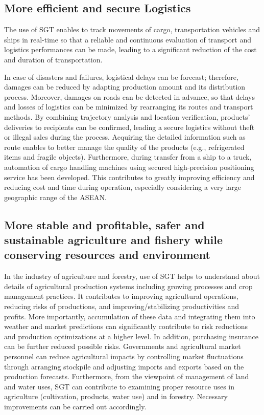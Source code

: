 \subsection{More efficient and secure Logistics}

\tab The use of SGT enables to track movements of cargo, transportation vehicles and ships in real-time so that a reliable and continuous evaluation of transport and logistics performances can be made, leading to a significant reduction of the cost and duration of transportation.

In case of disasters and failures, logistical delays can be forecast; therefore, damages can be reduced by adapting production amount and its distribution process. Moreover, damages on roads can be detected in advance, so that delays and losses of logistics can be minimized by rearranging its routes and transport methods. By combining trajectory analysis and location verification, products’ deliveries to recipients can be confirmed, leading a secure logistics without theft or illegal sales during the process. Acquiring the detailed information such as route enables to better manage the quality of the products (e.g., refrigerated items and fragile objects). Furthermore, during transfer from a ship to a truck, automation of cargo handling machines using secured high-precision positioning service has been developed. This contributes to greatly improving efficiency and reducing cost and time during operation, especially considering a very large geographic range of the ASEAN.

\subsection{More stable and profitable, safer and sustainable agriculture and fishery while conserving resources and environment}

\tab In the industry of agriculture and forestry, use of SGT helps to understand about details of agricultural production systems including growing processes and crop management practices. It contributes to improving agricultural operations, reducing risks of productions, and improving/stabilizing productivities and profits. More importantly, accumulation of these data and integrating them into weather and market predictions can significantly contribute to risk reductions and production optimizations at a higher level. In addition, purchasing insurance can be further reduced possible risks. Governments and agricultural market personnel can reduce agricultural impacts by controlling market fluctuations through arranging stockpile and adjusting imports and exports based on the production forecasts. Furthermore, from the viewpoint of management of land and water uses, SGT can contribute to examining proper resource uses in agriculture (cultivation, products, water use) and in forestry. Necessary improvements can be carried out accordingly.

